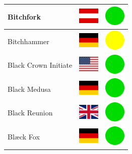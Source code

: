 \documentclass[12pt, a4paper, twoside]{report}
\begin{document}
\begin{center}
\begin{longtable}{|p{5cm}|p{2cm}|p{2cm}|}
 Bitchfork                                                  & \includegraphics[width=1cm]{../4x3/at} &   \includegraphics[width=1cm]{../likes/y} \\ \hline
 Bitchhammer                                                & \includegraphics[width=1cm]{../4x3/de} &   \includegraphics[width=1cm]{../likes/m} \\ \hline
 Black Crown Initiate                                       & \includegraphics[width=1cm]{../4x3/us} &   \includegraphics[width=1cm]{../likes/y} \\ \hline
 Black Medusa                                               & \includegraphics[width=1cm]{../4x3/de} &   \includegraphics[width=1cm]{../likes/y} \\ \hline
 Black Reunion                                              & \includegraphics[width=1cm]{../4x3/gb} &   \includegraphics[width=1cm]{../likes/y} \\ \hline
 Blæck Fox                                                  & \includegraphics[width=1cm]{../4x3/de} &   \includegraphics[width=1cm]{../likes/y} \\ \hline

\end{longtable}
\end{center}
\end{document}
